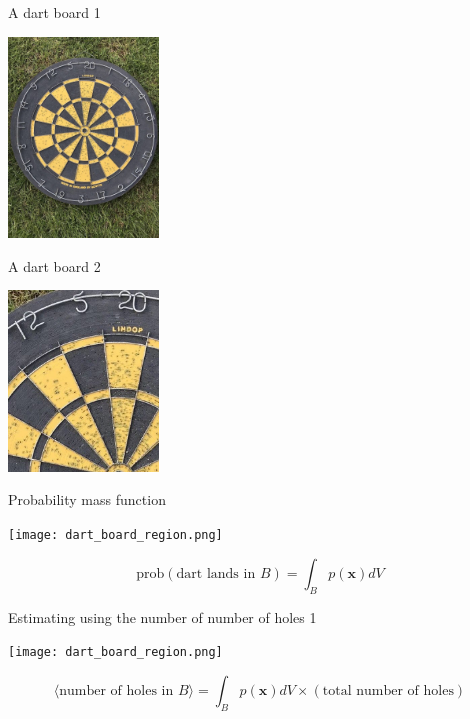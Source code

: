 \documentclass{beamer}
\begin{document}
\begin{frame}{A dart board 1}
\color{reddish}
\begin{center}
\includegraphics[width=4cm]{dart_board.jpg}
\end{center}
\color{black}
\vfill
\color{gray}
\color{black}
\end{frame}

\begin{frame}{A dart board 2}
\color{reddish}
\begin{center}
\includegraphics[width=4cm]{dart_board_zoom.png}
\end{center}
\color{black}
\end{frame}


\begin{frame}{Probability mass function}
\begin{center}
\texttt{[image: dart\_board\_region.png]}
\end{center}
\color{dark}
$$\mbox{prob}(\mbox{dart lands in }B)=\int_B p(\mathbf{x})dV$$
\color{black}
\end{frame}


\begin{frame}{Estimating using the number of number of holes 1}
\color{reddish}
\begin{center}
\texttt{[image: dart\_board\_region.png]}
\end{center}
\color{black}
$$\langle \mbox{number of holes in }B\rangle = \int_B p(\mathbf{x})dV \times (\mbox{total number of holes})$$
\end{frame}
\end{document}
